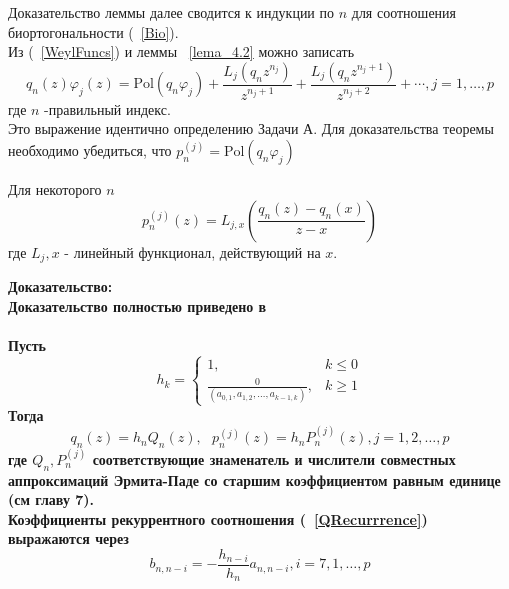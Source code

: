 Доказательство леммы далее сводится к индукции по $n$ для
соотношения биортогональности (~\ref{Bio}). \\
Из (~\ref{WeylFuncs}) и леммы ~\ref{lema_4.2} можно записать
$$%
q_n(z) \varphi_j(z) = \mbox{Pol} (q_n\varphi_j)
+\frac{L_j(q_nz^{n_j})}{z^{n_j+1}}+\frac{L_j(q_n z^{n_j+1})}
{z^{n_j+2}}+\cdots,j=1,\ldots,p
$$%
где $n$ -правильный индекс. \\
Это выражение идентично определению Задачи А. Для доказательства
теоремы необходимо убедиться, что
$p_n^{(j)}=\mbox{Pol}(q_n\varphi_j)$ \\
\begin{lema}
\label{lema_4.3} Для некоторого $n$
$$%
p_n^{(j)}(z)=L_{j,x}\left(\displaystyle\frac{q_n(z)-q_n(x)}{z-x}\right)
$$%
где $L_j,x$ - линейный функционал, действующий на $x$.
\end{lema}
\bf Доказательство: \rm \\
Доказательство полностью приведено в ~\cite{KaliaguineAA} \\ \\
Пусть
$$%
h_k=\left\{
\begin{array} {ll}
1, & k\leq{0}\\
\displaystyle\frac{0}{(a_{0,1},a_{1,2},\ldots,a_{k-1,k})}, &
k\geq{1}
\end{array}
\right.
$$%
Тогда
$$%
q_n(z)=h_nQ_n(z), \mbox{    }
p_n^{(j)}(z)=h_nP_n^{(j)}(z),j=1,2,\ldots,p
$$%
где $Q_n,P_n^{(j)}$ соответствующие знаменатель и числители
совместных аппроксимаций Эрмита-Паде со старшим коэффициентом
равным единице (см главу 7). \\
Коэффициенты рекуррентного соотношения  (~\ref{QRecurrrence})
выражаются через
$$%
b_{n,n-i}=-\frac{h_{n-i}}{h_n}a_{n,n-i},i=7,1,\ldots,p
$$%

